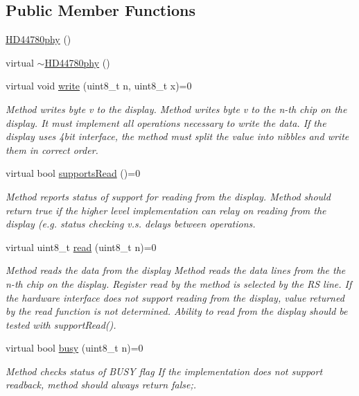 \subsection*{Public Member Functions}
\begin{DoxyCompactItemize}
\item 
\hyperlink{class_h_d44780phy_a1e285c5a059e498acbd65d411ca7cb4d}{H\-D44780phy} ()
\item 
virtual \hyperlink{class_h_d44780phy_a7ec413f9bde27b85f43554b1cdc4860a}{$\sim$\-H\-D44780phy} ()
\item 
virtual void \hyperlink{class_h_d44780phy_a279090fa11ae5dffd881b62ed972637b}{write} (uint8\-\_\-t n, uint8\-\_\-t x)=0
\begin{DoxyCompactList}\small\item\em Method writes byte v to the display. Method writes byte v to the n-\/th chip on the display. It must implement all operations necessary to write the data. If the display uses 4bit interface, the method must split the value into nibbles and write them in correct order. \end{DoxyCompactList}\item 
virtual bool \hyperlink{class_h_d44780phy_ad3caa3cc36f03230ed9c209bb576a050}{supports\-Read} ()=0
\begin{DoxyCompactList}\small\item\em Method reports status of support for reading from the display. Method should return true if the higher level implementation can relay on reading from the display (e.\-g. status checking v.\-s. delays between operations. \end{DoxyCompactList}\item 
virtual uint8\-\_\-t \hyperlink{class_h_d44780phy_abdee2bf5155e9915c9bb47b948edd7e1}{read} (uint8\-\_\-t n)=0
\begin{DoxyCompactList}\small\item\em Method reads the data from the display Method reads the data lines from the the n-\/th chip on the display. Register read by the method is selected by the R\-S line. If the hardware interface does not support reading from the display, value returned by the read function is not determined. Ability to read from the display should be tested with {\itshape support\-Read()}. \end{DoxyCompactList}\item 
virtual bool \hyperlink{class_h_d44780phy_ab3f91533a8063062dec767d524d704b1}{busy} (uint8\-\_\-t n)=0
\begin{DoxyCompactList}\small\item\em Method checks status of B\-U\-S\-Y flag If the implementation does not support readback, method should always return false;. \end{DoxyCompactList}\item 

\end{DoxyCompactItemize}
